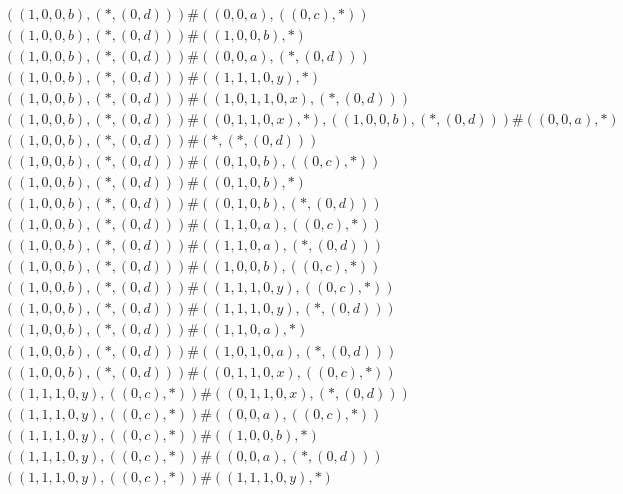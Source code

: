 \begin{align*}
	 & \qquad ((1, 0, 0, b), (*, (0, d))) \# ((0, 0, a), ((0, c), *)) \\ 
	 & \qquad ((1, 0, 0, b), (*, (0, d))) \# ((1, 0, 0, b), *) \\ 
	 & \qquad ((1, 0, 0, b), (*, (0, d))) \# ((0, 0, a), (*, (0, d))) \\ 
	 & \qquad ((1, 0, 0, b), (*, (0, d))) \# ((1, 1, 1, 0, y), *) \\ 
	 & \qquad ((1, 0, 0, b), (*, (0, d))) \# ((1, 0, 1, 1, 0, x), (*, (0, d))) \\ 
	 & \qquad ((1, 0, 0, b), (*, (0, d))) \# ((0, 1, 1, 0, x), *), ((1, 0, 0, b), (*, (0, d))) \# ((0, 0, a), *) \\ 
	 & \qquad ((1, 0, 0, b), (*, (0, d))) \# (*, (*, (0, d))) \\ 
	 & \qquad ((1, 0, 0, b), (*, (0, d))) \# ((0, 1, 0, b), ((0, c), *)) \\ 
	 & \qquad ((1, 0, 0, b), (*, (0, d))) \# ((0, 1, 0, b), *) \\ 
	 & \qquad ((1, 0, 0, b), (*, (0, d))) \# ((0, 1, 0, b), (*, (0, d))) \\ 
	 & \qquad ((1, 0, 0, b), (*, (0, d))) \# ((1, 1, 0, a), ((0, c), *)) \\ 
	 & \qquad ((1, 0, 0, b), (*, (0, d))) \# ((1, 1, 0, a), (*, (0, d))) \\ 
	 & \qquad ((1, 0, 0, b), (*, (0, d))) \# ((1, 0, 0, b), ((0, c), *)) \\ 
	 & \qquad ((1, 0, 0, b), (*, (0, d))) \# ((1, 1, 1, 0, y), ((0, c), *)) \\ 
	 & \qquad ((1, 0, 0, b), (*, (0, d))) \# ((1, 1, 1, 0, y), (*, (0, d))) \\ 
	 & \qquad ((1, 0, 0, b), (*, (0, d))) \# ((1, 1, 0, a), *) \\ 
	 & \qquad ((1, 0, 0, b), (*, (0, d))) \# ((1, 0, 1, 0, a), (*, (0, d))) \\ 
	 & \qquad ((1, 0, 0, b), (*, (0, d))) \# ((0, 1, 1, 0, x), ((0, c), *)) \\ 
	 & \qquad ((1, 1, 1, 0, y), ((0, c), *)) \# ((0, 1, 1, 0, x), (*, (0, d))) \\ 
	 & \qquad ((1, 1, 1, 0, y), ((0, c), *)) \# ((0, 0, a), ((0, c), *)) \\ 
	 & \qquad ((1, 1, 1, 0, y), ((0, c), *)) \# ((1, 0, 0, b), *) \\ 
	 & \qquad ((1, 1, 1, 0, y), ((0, c), *)) \# ((0, 0, a), (*, (0, d))) \\ 
	 & \qquad ((1, 1, 1, 0, y), ((0, c), *)) \# ((1, 1, 1, 0, y), *) \\ 

\end{align*}
